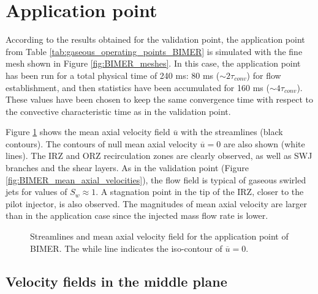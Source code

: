 \clearpage

\section{Application point}
	\label{ch7:BIMER_application_point}
	
According to the results obtained for the validation point, the application point from Table \ref{tab:gaseous_operating_points_BIMER} is simulated with the fine mesh shown in Figure \ref{fig:BIMER_meshes}. In this case, the application point has been run for a total physical time of 240 ms: 80 ms ($\sim 2 \tau_{conv}$) for flow establishment, and then statistics have been accumulated for 160 ms ($\sim 4 \tau_{conv}$). These values have been chosen to keep the same convergence time with respect to the convective characteristic time as in the validation point.
	
Figure \ref{fig:BIMER_application_streamlines} shows the mean axial velocity field $\overline{u}$ with the streamlines (black contours). The contours of null mean axial velocity $\overline{u} = 0$ are also shown (white lines). The IRZ and ORZ recirculation zones are clearly observed, as well as SWJ branches and the shear layers. As in the validation point (Figure \ref{fig:BIMER_mean_axial_velocities}), the flow field is typical of gaseous swirled jets for values of $S_w \approx 1$. A stagnation point in the tip of the IRZ, closer to the pilot injector, is also observed. The magnitudes of mean axial velocity are larger than in the application case since the injected mass flow rate is lower.

\begin{figure}[ht]
\centering
{}
\caption[Streamlines and mean axial velocity field for the application point of BIMER]{Streamlines and mean axial velocity field for the application point of BIMER. The while line indicates the iso-contour of $\overline{u} = 0$.}
\label{fig:BIMER_application_streamlines}
\end{figure}

\subsection{Velocity fields in the middle plane}

